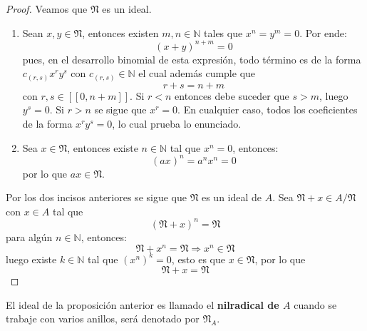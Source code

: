\documentclass[12pt]{report}
\newcounter{it}
\theoremstyle{largebreak}
\newcommand\natint[1]{\ensuremath{\left[\!\left[ #1\right]\!\right]}}
\begin{document}
    \begin{proof}
        Veamos que $\mathfrak{N}$ es un ideal.
        \begin{enumerate}[label = \textit{(\arabic*)}]
            \item Sean $x,y\in\mathfrak{N}$, entonces existen $m,n\in\mathbb{N}$ tales que $x^n=y^m=0$. Por ende:
            \begin{equation*}
                (x+y)^{ n+m}=0
            \end{equation*}
            pues, en el desarrollo binomial de esta expresión, todo término es de la forma $c_{(r,s)}x^ry^s$ con $c_{(r,s)}\in\mathbb{N}$ el cual además cumple que
            \begin{equation*}
                r+s=n+m
            \end{equation*}
            con $r,s\in\natint{0,n+m}$. Si $r<n$ entonces debe suceder que $s>m$, luego $y^s=0$. Si $r>n$ se sigue que $x^r=0$. En cualquier caso, todos los coeficientes de la forma $x^ry^s=0$, lo cual prueba lo enunciado.
            \item Sea $x\in\mathfrak{N}$, entonces existe $n\in\mathbb{N}$ tal que $x^n=0$, entonces:
            \begin{equation*}
                (ax)^n=a^nx^n=0
            \end{equation*}
            por lo que $ax\in\mathfrak{N}$.
        \end{enumerate}
        Por los dos incisos anteriores se sigue que $\mathfrak{N}$ es un ideal de $A$. Sea $\mathfrak{N}+x\in A/\mathfrak{N}$ con $x\in A$ tal que
        \begin{equation*}
            (\mathfrak{N}+x)^n=\mathfrak{N}
        \end{equation*}
        para algún $n\in\mathbb{N}$, entonces:
        \begin{equation*}
            \mathfrak{N}+x^n=\mathfrak{N}\Rightarrow x^n\in\mathfrak{N}
        \end{equation*}
        luego existe $k\in\mathbb{N}$ tal que $(x^n)^k=0$, esto es que $x\in\mathfrak{N}$, por lo que
        \begin{equation*}
            \mathfrak{N}+x=\mathfrak{N}
        \end{equation*}
    \end{proof}

    \begin{mydef}
        El ideal de la proposición anterior es llamado el \textbf{nilradical de $A$} cuando se trabaje con varios anillos, será denotado por $\mathfrak{N}_A$.
    \end{mydef}
\end{document}

